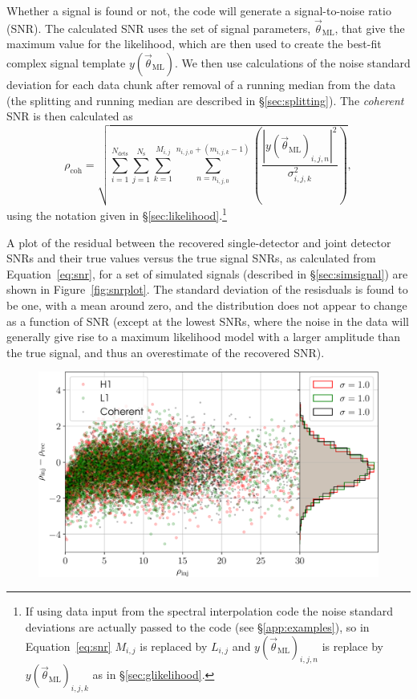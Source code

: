 Whether a signal is found or not, the code will generate a signal-to-noise ratio (SNR). The calculated SNR uses the set of signal
parameters, $\vec{\theta}_{\text{ML}}$, that give the maximum value for the likelihood, which are then used to create the best-fit
complex signal template $y(\vec{\theta}_{\text{ML}})$. We then use calculations of the
noise standard deviation for each data chunk after removal of a running median from the data (the splitting and running median are
described in \S\ref{sec:splitting}). The {\it coherent} SNR is then calculated as
\begin{equation}\label{eq:snr}
 \rho_{\text{coh}} = \sqrt{\sum_{i=1}^{N_{\text{dets}}} \sum_{j=1}^{N_{\text{s}}}
\sum_{k=1}^{M_{i,j}} \sum_{n=n_{i,j,0}}^{n_{i,j,0}+(m_{i,j,k}-1)}\left(\frac{|y(\vec{\theta}_{\text{ML}})_{i,j,n}|^2}{\sigma_{i,j,k}^2}\right)},
\end{equation}
using the notation given in \S\ref{sec:likelihood}.\footnote{If using data input from the spectral interpolation code \citep{2017CQGra..34a5010D}
the noise standard deviations are actually passed to the code (see \S\ref{app:examples}), so in Equation~\ref{eq:snr} $M_{i,j}$ is replaced
by $L_{i,j}$ and $y(\vec{\theta}_{\text{ML}})_{i,j,n}$ is replace by $y(\vec{\theta}_{\text{ML}})_{i,j,k}$ as in \S\ref{sec:glikelihood}.}

A plot of the residual between the recovered single-detector and joint detector SNRs and their true values versus the true signal SNRs,
as calculated from Equation~\ref{eq:snr}, for a set of simulated signals (described in \S\ref{sec:simsignal}) are shown in Figure~\ref{fig:snrplot}.
The standard deviation of the resisduals is found to be one, with a mean around zero, and the distribution does not appear to change as a function of SNR (except at the
lowest SNRs, where the noise in the data will generally give rise to a maximum likelihood model with a larger amplitude than the true signal, and thus
an overestimate of the recovered SNR).

\begin{figure}[!phtb]
\begin{center}
\includegraphics[width=1\columnwidth]{./figures/codeeval/stats/snrs/snr_plot}
\caption{ \protect}
\end{center}
\end{figure}

